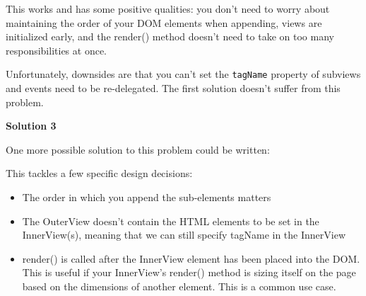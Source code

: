 \documentclass[9pt]{book}
\newenvironment{Shaded}{}{}
\newcommand{\KeywordTok}[1]{\textcolor[rgb]{0.00,0.44,0.13}{\textbf{{#1}}}}
\newcommand{\DataTypeTok}[1]{\textcolor[rgb]{0.56,0.13,0.00}{{#1}}}
\newcommand{\CommentTok}[1]{\textcolor[rgb]{0.38,0.63,0.69}{\textit{{#1}}}}
\newcommand{\OtherTok}[1]{\textcolor[rgb]{0.00,0.44,0.13}{{#1}}}
\newcommand{\FunctionTok}[1]{\textcolor[rgb]{0.02,0.16,0.49}{{#1}}}
\newcommand{\NormalTok}[1]{{#1}}
\begin{document}
This works and has some positive qualities: you don't need to worry
about maintaining the order of your DOM elements when appending, views
are initialized early, and the render() method doesn't need to take on
too many responsibilities at once.

Unfortunately, downsides are that you can't set the \texttt{tagName}
property of subviews and events need to be re-delegated. The first
solution doesn't suffer from this problem.

\textbf{Solution 3}

One more possible solution to this problem could be written:

\begin{Shaded}
\end{Shaded}

This tackles a few specific design decisions:

\begin{itemize}
\itemsep1pt\parskip0pt
\item
  The order in which you append the sub-elements matters
\item
  The OuterView doesn't contain the HTML elements to be set in the
  InnerView(s), meaning that we can still specify tagName in the
  InnerView
\item
  render() is called after the InnerView element has been placed into
  the DOM. This is useful if your InnerView's render() method is sizing
  itself on the page based on the dimensions of another element. This is
  a common use case.
\end{itemize}
\end{document}
